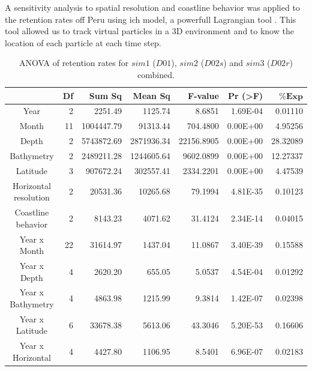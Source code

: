 A sensitivity analysis to spatial resolution and coastline behavior was applied to the retention rates off Peru using \gls{ich} model, a powerfull Lagrangian tool \citep{LettVerl2008}. This tool allowed us to track virtual particles in a 3D environment and to know the location of each particle at each time step.\\

\begin{table}[H]
    \centering
    \caption{ANOVA of retention rates for $sim 1$ ($D01$), $sim 2$ ($D02s$) and $sim 3$ ($D02r$) combined.}
    \begin{adjustbox}{width=0.9\textwidth}
    \small
    \begin{tabular}{c|r|r|r|r|r|r}
\toprule
								&
\textbf{Df}                   	&
\textbf{Sum Sq}               	&
\textbf{Mean Sq}              	&
\textbf{F-value}    		   	&
\textbf{Pr (\textgreater{F})}	&
$\mathbf{\% Exp}$				\\
\midrule
Year		& 
2			& 
2251.49		& 
1125.74		& 
8.6851		& 
1.69E-04	& 
0.01110		\\
Month			& 
11				& 
1004447.79		& 
91313.44		& 
704.4800		& 
0.00E+00		& 
4.95256			\\
Depth		& 
2			& 
5743872.69	& 
2871936.34	& 
22156.8905	& 
0.00E+00	& 
28.32089	\\
Bathymetry		& 
2				& 
2489211.28		& 
1244605.64		& 
9602.0899		& 
0.00E+00		& 
12.27337		\\
Latitude	& 
3			& 
907672.24	& 
302557.41	& 
2334.2201	& 
0.00E+00	& 
4.47539		\\
Horizontal resolution	& 
2						& 
20531.36				& 
10265.68				& 
79.1994					& 
4.81E-35				& 
0.10123					\\
Coastline behavior	&
2					& 
8143.23				& 
4071.62				& 
31.4124				& 
2.34E-14			& 
0.04015				\\
Year x Month	& 
22				& 
31614.97		& 
1437.04			& 
11.0867			& 
3.40E-39		& 
0.15588			\\
Year x Depth		& 
4					& 
2620.20				& 
655.05				& 
5.0537				& 
4.54E-04			& 
0.01292				\\
Year x Bathymetry		& 
4						& 
4863.98					& 
1215.99					& 
9.3814					& 
1.42E-07				& 
0.02398					\\
Year x Latitude		& 
6					& 
33678.38			& 
5613.06				& 
43.3046				& 
5.20E-53			& 
0.16606				\\
Year x Horizontal		& 
4						& 
4427.80					& 
1106.95					& 
8.5401					& 
6.96E-07				& 
0.02183					\\

\end{tabular}
\end{adjustbox}
\end{table}
